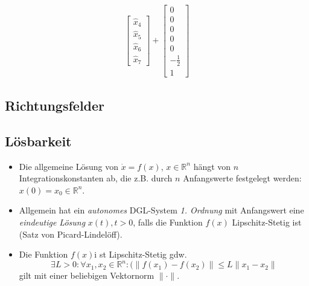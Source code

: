 \begin{itemize}
\begin{align*}
\begin{bmatrix}
						        \hat{x} _ 4 \\
						        \hat{x} _ 5 \\
						        \hat{x} _ 6 \\
						        \hat{x} _ 7
					        \end{bmatrix}
					        +
					        \begin{bmatrix}
						        0 \\
						        0 \\
						        0 \\
						        0 \\
						        0 \\
						        -\frac{1}{2} \\
						        1
					        \end{bmatrix}
				        \end{align*}
                \end{itemize}

		\subsection{Richtungsfelder} %

        \subsection{Lösbarkeit} %
            \begin{itemize}
            	\item Die allgemeine Lösung von \( \dot{x} = f(x) \), \( x \in \mathbb{R} ^ n \) hängt von \( n \) Integrationskonstanten ab, die z.B. durch \( n \) Anfangswerte festgelegt werden: \( x(0) = x _ 0 \in \mathbb{R} ^ n \).
            	\item Allgemein hat ein \textit{autonomes} DGL-System \textit{1. Ordnung} mit Anfangswert eine \textit{eindeutige Lösung} \( x(t), t > 0 \), falls die Funktion \( f(x) \) Lipschitz-Stetig ist (Satz von Picard-Lindelöff).
            	\item Die Funktion \( f(x) \)i st Lipschitz-Stetig gdw. \[ \exists L > 0 : \forall x _ 1, x _ 2 \in \mathbb{R} ^ n : (\lVert f(x _ 1) - f(x _ 2) \rVert \leq L \lVert x _ 1 - x _ 2 \rVert \] gilt mit einer beliebigen Vektornorm \( \lVert \cdot \rVert \).
            \end{itemize}

